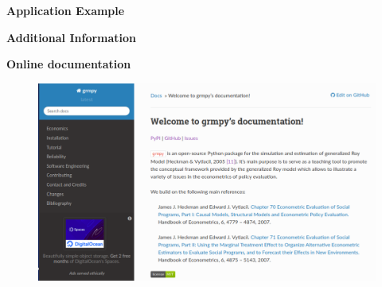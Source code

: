 \begin{frame}\begin{center}
\LARGE\textbf{Application Example}
\end{center}\end{frame}


\begin{frame}\begin{center}
\LARGE\textbf{Additional Information}
\end{center}\end{frame}



\begin{frame}
\textbf{Online documentation}
\begin{figure}
  \includegraphics[scale=0.2]{../material/05_grmpy_tutorial/docu.png}
\end{figure}

\end{frame}
